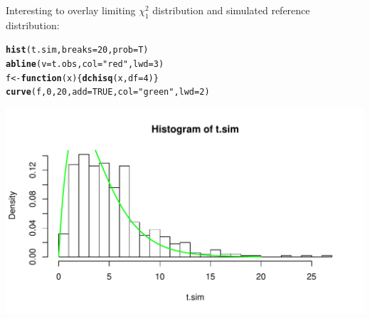 \documentclass[compress]{beamer}\usepackage[]{graphicx}\usepackage[]{color}
\makeatletter
\def\maxwidth{ %
  \ifdim\Gin@nat@width>\linewidth
    \linewidth
  \else
    \Gin@nat@width
  \fi
}
\newcommand{\hlnum}[1]{\textcolor[rgb]{0.686,0.059,0.569}{#1}}%
\newcommand{\hlstr}[1]{\textcolor[rgb]{0.192,0.494,0.8}{#1}}%
\newcommand{\hlstd}[1]{\textcolor[rgb]{0.345,0.345,0.345}{#1}}%
\newcommand{\hlkwa}[1]{\textcolor[rgb]{0.161,0.373,0.58}{\textbf{#1}}}%
\newcommand{\hlkwb}[1]{\textcolor[rgb]{0.69,0.353,0.396}{#1}}%
\newcommand{\hlkwc}[1]{\textcolor[rgb]{0.333,0.667,0.333}{#1}}%
\newcommand{\hlkwd}[1]{\textcolor[rgb]{0.737,0.353,0.396}{\textbf{#1}}}%
\newenvironment{kframe}{%
 \def\at@end@of@kframe{}%
 \ifinner\ifhmode%
  \def\at@end@of@kframe{\end{minipage}}%
  \begin{minipage}{\columnwidth}%
 \fi\fi%
 \def\FrameCommand##1{\hskip\@totalleftmargin \hskip-\fboxsep
 \colorbox{shadecolor}{##1}\hskip-\fboxsep
     \hskip-\linewidth \hskip-\@totalleftmargin \hskip\columnwidth}%
 \MakeFramed {\advance\hsize-\width
   \@totalleftmargin\z@ \linewidth\hsize
   \@setminipage}}%
 {\par\unskip\endMakeFramed%
 \at@end@of@kframe}
\newenvironment{knitrout}{}{} %
\newenvironment{sframe}
{\begin{frame} [containsverbatim] }
  {\end{frame}}
\makeatother
\begin{document}
\begin{sframe}

  Interesting to overlay limiting $\chi^2_1$
  distribution and simulated reference distribution:
  
\begin{knitrout}\scriptsize
{}\color{fgcolor}\begin{kframe}
\begin{alltt}
\hlkwd{hist}\hlstd{(t.sim,} \hlkwc{breaks}\hlstd{=}\hlnum{20}\hlstd{,} \hlkwc{prob}\hlstd{=T)}
\hlkwd{abline}\hlstd{(}\hlkwc{v}\hlstd{=t.obs,} \hlkwc{col}\hlstd{=}\hlstr{"red"}\hlstd{,} \hlkwc{lwd}\hlstd{=}\hlnum{3}\hlstd{)}
\hlstd{f} \hlkwb{<-} \hlkwa{function}\hlstd{(}\hlkwc{x}\hlstd{)\{}\hlkwd{dchisq}\hlstd{(x,} \hlkwc{df}\hlstd{=}\hlnum{4}\hlstd{)\}}
\hlkwd{curve}\hlstd{(f,} \hlnum{0}\hlstd{,} \hlnum{20}\hlstd{,} \hlkwc{add}\hlstd{=}\hlnum{TRUE}\hlstd{,} \hlkwc{col}\hlstd{=}\hlstr{"green"}\hlstd{,} \hlkwc{lwd}\hlstd{=}\hlnum{2}\hlstd{)}
\end{alltt}
\end{kframe}
\includegraphics[width=\maxwidth]{fig/tartu-unnamed-chunk-24-1} 

\end{knitrout}
  
\end{sframe}
\end{document}
